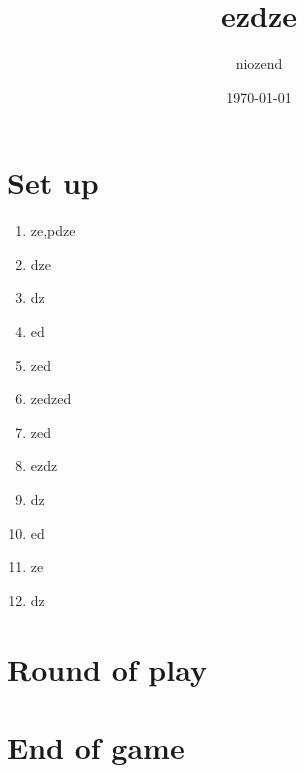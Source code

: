 \documentclass{article}%
\title{ezdze}%
\author{niozend}%
\date{\today}%
\begin{document}
%
\pagestyle{empty}%
\normalsize%
\maketitle%
\section{ Set up
}%
\label{sec:Setup}%
\begin{enumerate}%
\item%
 ze,pdze
%
\item%
 dze
%
\item%
 dz
%
\item%
 ed
%
\item%
 zed
%
\item%
 zedzed
%
\item%
 zed
%
\item%
 ezdz
%
\item%
 dz
%
\item%
 ed
%
\item%
 ze
%
\item%
 dz
%
\end{enumerate}

%
\section{ Round of play
}%
\label{sec:Roundofplay}%

%
\section{ End of game}%
\label{sec:Endofgame}%

%
\end{document}
